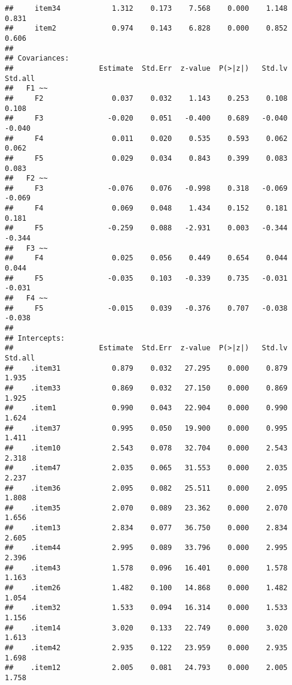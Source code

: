 \documentclass[
  english,
  man]{apa6}
\begin{document}
\begin{verbatim}
##     item34            1.312    0.173    7.568    0.000    1.148    0.831
##     item2             0.974    0.143    6.828    0.000    0.852    0.606
## 
## Covariances:
##                    Estimate  Std.Err  z-value  P(>|z|)   Std.lv  Std.all
##   F1 ~~                                                                 
##     F2                0.037    0.032    1.143    0.253    0.108    0.108
##     F3               -0.020    0.051   -0.400    0.689   -0.040   -0.040
##     F4                0.011    0.020    0.535    0.593    0.062    0.062
##     F5                0.029    0.034    0.843    0.399    0.083    0.083
##   F2 ~~                                                                 
##     F3               -0.076    0.076   -0.998    0.318   -0.069   -0.069
##     F4                0.069    0.048    1.434    0.152    0.181    0.181
##     F5               -0.259    0.088   -2.931    0.003   -0.344   -0.344
##   F3 ~~                                                                 
##     F4                0.025    0.056    0.449    0.654    0.044    0.044
##     F5               -0.035    0.103   -0.339    0.735   -0.031   -0.031
##   F4 ~~                                                                 
##     F5               -0.015    0.039   -0.376    0.707   -0.038   -0.038
## 
## Intercepts:
##                    Estimate  Std.Err  z-value  P(>|z|)   Std.lv  Std.all
##    .item31            0.879    0.032   27.295    0.000    0.879    1.935
##    .item33            0.869    0.032   27.150    0.000    0.869    1.925
##    .item1             0.990    0.043   22.904    0.000    0.990    1.624
##    .item37            0.995    0.050   19.900    0.000    0.995    1.411
##    .item10            2.543    0.078   32.704    0.000    2.543    2.318
##    .item47            2.035    0.065   31.553    0.000    2.035    2.237
##    .item36            2.095    0.082   25.511    0.000    2.095    1.808
##    .item35            2.070    0.089   23.362    0.000    2.070    1.656
##    .item13            2.834    0.077   36.750    0.000    2.834    2.605
##    .item44            2.995    0.089   33.796    0.000    2.995    2.396
##    .item43            1.578    0.096   16.401    0.000    1.578    1.163
##    .item26            1.482    0.100   14.868    0.000    1.482    1.054
##    .item32            1.533    0.094   16.314    0.000    1.533    1.156
##    .item14            3.020    0.133   22.749    0.000    3.020    1.613
##    .item42            2.935    0.122   23.959    0.000    2.935    1.698
##    .item12            2.005    0.081   24.793    0.000    2.005    1.758

\end{verbatim}
\end{document}
